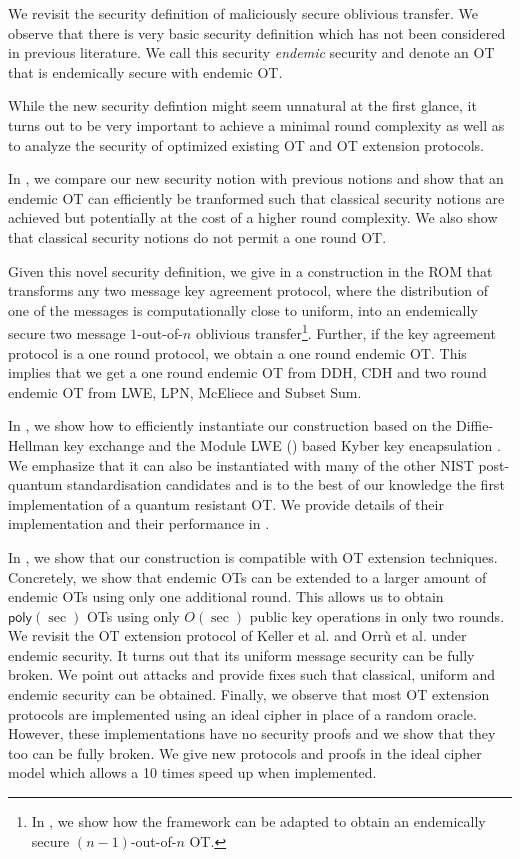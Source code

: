 We revisit the security definition of maliciously secure oblivious transfer. We observe that there is very basic security definition which has not been considered in previous literature. We call this security \emph{endemic} security and denote an OT that is endemically secure with endemic OT. 

While the new security defintion might seem unnatural at the first glance, it turns out to be very important to achieve a minimal round complexity as well as to analyze the security of optimized existing OT and OT extension protocols.

In , we compare our new security notion with previous notions and show that an endemic OT can efficiently  be tranformed such that classical security notions are achieved but potentially at the cost of a higher round complexity. We also show that classical security notions do not permit a one round OT.

Given this novel security definition, we give in  a construction in the ROM that transforms any two message key agreement protocol, where the distribution of one of the messages is computationally close to uniform, into an endemically secure two message $1$-out-of-$n$ oblivious transfer\footnote{In , we show how the framework can be adapted to obtain an endemically secure $(n-1)$-out-of-$n$ OT.}. Further, 
if the key agreement protocol is a one round protocol, we obtain a one round endemic OT. This implies that we get a one round endemic OT from DDH, CDH and two round endemic OT from LWE, LPN, McEliece and Subset Sum.

In , we show how to efficiently instantiate our construction based on the Diffie-Hellman key exchange and the Module LWE (\MLWE) based Kyber key encapsulation \cite{NISTPQC-R1:CRYSTALS-KYBER17}. We emphasize that it can also be instantiated with many of the other NIST post-quantum standardisation candidates and is to the best of our knowledge the first implementation of a quantum resistant OT. We provide details of their implementation and their performance in .

In , we show that our construction is compatible with OT extension techniques. Concretely, we show that endemic OTs can be extended to a larger amount of endemic OTs using only one additional round. This allows us to obtain $\mathsf{poly}(\sec)$ OTs using only $O(\sec)$ public key operations in only two rounds. We revisit the OT extension protocol of Keller et al. and Orr{\`u} et al. \cite{C:KelOrsSch15,RSA:OrrOrsSch17} under endemic security. It turns out that its uniform message security can be fully broken. We point out attacks and provide fixes such that classical, uniform and endemic security can be obtained. Finally, we observe that most OT extension protocols are implemented using an ideal cipher in place of a random oracle. However, these implementations have no security proofs and we show that they too can be fully broken. We give new protocols and proofs in the ideal cipher model which allows a 10 times speed up when implemented. 


